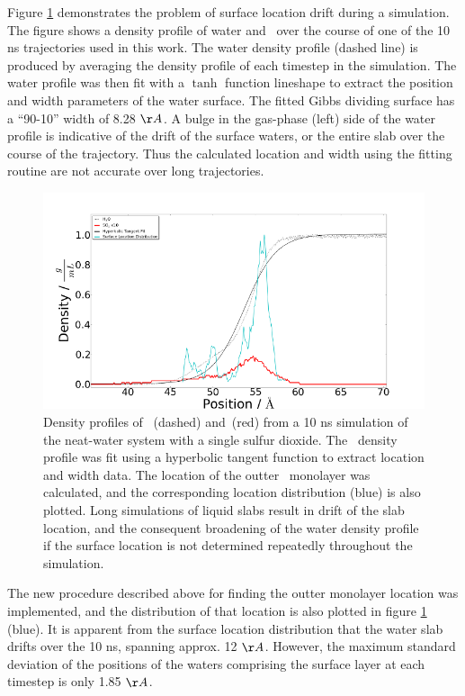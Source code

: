 Figure \ref{fig:density-flaw} demonstrates the problem of surface location drift during a simulation. The figure shows a density profile of water and \suldiox~over the course of one of the 10 ns trajectories used in this work. The water density profile (dashed line) is produced by averaging the density profile of each timestep in the simulation. The water profile was then fit with a $\tanh$ function lineshape to extract the position and width parameters of the water surface. The fitted Gibbs dividing surface has a ``90-10'' width of 8.28 $\AA$. A bulge in the gas-phase (left) side of the water profile is indicative of the drift of the surface waters, or the entire slab over the course of the trajectory. Thus the calculated location and width using the fitting routine are not accurate over long trajectories. 

\begin{figure}[h!]
	\begin{center}
		\includegraphics[scale=1.0]{images/density/Density+SurfaceLocation-flawed.png}
		\caption{Density profiles of \wat~(dashed) and\suldiox~(red) from a 10 ns simulation of the neat-water system with a single sulfur dioxide. The \wat~density profile was fit using a hyperbolic tangent function to extract location and width data. The location of the outter \wat~monolayer was calculated, and the corresponding location distribution (blue) is also plotted. Long simulations of liquid slabs result in drift of the slab location, and the consequent broadening of the water density profile if the surface location is not determined repeatedly throughout the simulation.}
		\label{fig:density-flaw}
	\end{center}
\end{figure}

The new procedure described above for finding the outter monolayer location was implemented, and the distribution of that location is also plotted in figure \ref{fig:density-flaw} (blue). It is apparent from the surface location distribution that the water slab drifts over the 10 ns, spanning approx. 12 $\AA$. However, the maximum standard deviation of the positions of the waters comprising the surface layer at each timestep is only 1.85 $\AA$. 

